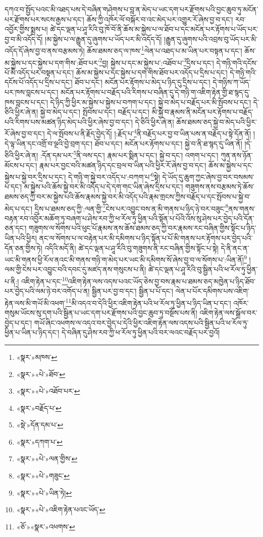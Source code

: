 དཀའ་བ་སྤྱོད་པའང་མི་འཐད་པས་དེ་བཞིན་གཤེགས་པ་བླ་ན་མེད་པ་ཡང་དག་པར་རྫོགས་པའི་བྱང་ཆུབ་ཏུ་མངོན་པར་རྫོགས་པར་སངས་རྒྱས་པ་དང་། ཆོས་ཀྱི་འཁོར་ལོ་བསྐོར་བ་འང་མེད་པར་འགྱུར་རོ་ཞེས་བྱ་བ་དང་། རབ་འབྱོར་གྱིས་སྨྲས་པ། ཚེ་དང་ལྡན་པ་ཤཱ་རིའི་བུ་ཁོ་བོ་ནི་ཆོས་མ་སྐྱེས་པ་ལ་ཐོབ་པ་དང་མངོན་པར་རྟོགས་པ་ཡོད་པར་བྱ་བ་མི་འདོད་དོ། །མ་སྐྱེས་པ་ལ་རྒྱུན་དུ་ཞུགས་པ་ཡོད་པར་མི་འདོད་དོ། །རྒྱུན་དུ་ཞུགས་པའི་འབྲས་བུ་ཡོད་པར་མི་འདོད་དོ་ཞེས་བྱ་བ་ནས་བརྩམས་ཏེ། ཆོས་ཐམས་ཅད་ལ་ཁས་\footnote{«སྣར་»མཁས་}ལེན་པ་འཐད་པ་མ་ཡིན་པར་བསྟན་པ་དང་། ཆོས་མ་སྐྱེས་པ་དང་སྐྱེས་པ་དག་གིས་:ཐོབ་པར་\footnote{«སྣར་»«པེ་»ཐོབ་}བྱ། སྐྱེས་པ་དང་མ་སྐྱེས་པ་:འཐོབ་པ་\footnote{«སྣར་»«པེ་»འཐོབ་པར་}དྲིས་པ་དང་། དེ་གཉི་གའི་དངོས་པོ་མི་འདོད་པར་བསྟན་པ་དང་། ཆོས་མ་སྐྱེས་པ་དང་སྐྱེས་པ་དག་གིས་ཐོབ་པར་འདོད་པ་དྲིས་པ་དང་། དེ་གཉི་གའི་དངོས་པོ་འདོད་པ་དྲིས་པ་དང་། ཐོབ་པ་དང་། མངོན་པར་རྟོགས་པ་མེད་པ་ཉིད་དུ་དྲིས་པ་དང་། དེ་གཉིས་ཀ་ཡོད་པར་ཁས་བླངས་པ་དང་། མངོན་པར་རྟོགས་པ་བརྗོད་པའི་རིགས་པ་བཞིན་དུ་དེ་གཉི་ག་འཇིག་རྟེན་གྱི་ཐ་སྙད་དུ་ཁས་བླངས་པ་དང་། དེ་ཉིད་ཀྱི་ཕྱིར་མ་སྐྱེས་པ་སྐྱེས་པ་བཀག་པ་དང་། སྐྱེ་བ་མེད་པ་བརྗོད་པར་མི་སྤོབས་པ་དང་། དེ་ཅིའི་ཕྱིར་ཞེ་ན། སྐྱེ་བ་མེད་པ་དང་། སྤོབས་པ་དང་། བརྗོད་པ་དང་། མི་སྐྱེ་བ་རྣམས་ནི་མངོན་པར་རྟོགས་པ་བརྗོད་པའི་རིགས་པས་མཚན་ཉིད་མེད་པའི་ཕྱིར་ཞེས་བྱ་བ་དང་། དེ་ཅིའི་ཕྱིར་ཞེ་ན། ཆོས་ཐམས་ཅད་སྐྱེ་བ་མེད་པའི་ཕྱིར་རོ་ཞེས་བྱ་བ་དང་། དེ་ལ་སྤོབས་པ་ནི་རྗོད་བྱེད་དོ། །:རྗོད་པ་\footnote{«སྣར་»བརྗོད་པ་}ནི་བརྗོད་པར་བྱ་བ་ཡིན་པས་ན་བརྗོད་པ་སྟེ་དོན་ནོ། །དེ་ལྟ་ཡིན་དང་འགྲོ་བ་ལྔའི་བྱེ་བྲག་དང་། ཐོབ་པ་དང་། མངོན་པར་རྟོགས་པ་དང་། སྐྱེ་བ་ནི་ཐ་སྙད་དུ་ཡིན་ནོ། །དེ་ཅིའི་ཕྱིར་ཞེ་ན། :དོན་དམ་པར་\footnote{«སྡེ་»དོན་དམ་པ་}ནི་ལས་དང་། རྣམ་པར་སྨིན་པ་དང་། སྐྱེ་བ་དང་། འགག་པ་དང་། ཀུན་ནས་ཉོན་མོངས་པ་དང་། རྣམ་པར་བྱང་བའི་མཚན་ཉིད་དང་བྲལ་བ་ཡིན་པའི་ཕྱིར་རོ་ཞེས་བྱ་བ་དང་། ཆོས་མ་སྐྱེས་པ་དང་སྐྱེས་པ་སྐྱེ་བར་དྲིས་པ་དང་། དེ་གཉི་ག་སྐྱེ་བར་འདོད་པ་:བཀག་པ་\footnote{«སྣར་»དཀག་པ་}སྟེ། དེ་ཡོད་དུ་ཆུག་ཀྱང་ཞེས་བྱ་བར་བསམས་པ་དང་། མ་སྐྱེས་པའི་ཆོས་སྐྱེ་བར་མི་འདོད་པ་དེ་དག་གང་ཡིན་ཞེས་དྲིས་པ་དང་། གཟུགས་ནས་བརྩམས་ཏེ་ཆོས་ཐམས་ཅད་ཀྱི་བར་མ་སྐྱེས་པའི་ཆོས་རྣམས་སྐྱེ་བར་མི་འདོད་པའི་རྣམ་གྲངས་ཀྱིས་བརྗོད་པ་དང་སྤོབས་པ་སྐྱེ་བ་མེད་པ་དང་། དྲིས་པ་ཐམས་ཅད་ཀྱི་:ལན་གྱི་\footnote{«སྣར་»«པེ་»ལན་གྱིས་}ངེས་པར་འབྱུང་བས་ན་མི་གནས་པ་ཉིད་ཉེ་བར་བཟུང་\footnote{«སྣར་»«པེ་»གཟུང་}ནས་གནས་བརྟན་རབ་འབྱོར་མཆོག་ཏུ་བཞག་པ་ཤེས་རབ་ཀྱི་ཕ་རོལ་ཏུ་ཕྱིན་པའི་སྟོན་པ་པོའི་འོས་སུ་ཤེས་པར་བྱེད་པའི་དོན་ཅན་དང་། གཟུགས་ལ་སོགས་པའི་ཕུང་པོ་རྣམས་ནས་ཆོས་ཐམས་ཅད་ཀྱི་བར་རྣམས་རང་བཞིན་གྱིས་སྟོང་པ་ཉིད་ཡིན་པའི་ཕྱིར། ནང་ལ་སོགས་པ་ལ་བརྟེན་པར་མི་དམིགས་པ་ཉིད་སྟོན་པ་པོ་མི་གནས་པར་རྟོགས་པར་བྱེད་པའི་དོན་ཅན་གྱིས་ཏེ། འདིའི་མདོ་ནི། ཚེ་དང་ལྡན་པ་ཤཱ་རིའི་བུ་གཟུགས་ནི་རང་བཞིན་གྱིས་སྟོང་པ་སྟེ། དེ་ནི་ནང་ན་ཡང་མི་གནས་ཕྱི་རོལ་ནའང་མི་གནས་གཉི་ག་མེད་པར་ཡང་མི་དམིགས་སོ་ཞེས་བྱ་བ་ལ་སོགས་པ་:ཡིན་ནོ།\footnote{«སྣར་»«པེ་»ཡིན་ཏེ།} །ལམ་གྱི་ངེས་པར་འབྱུང་བའི་དབང་དུ་མཛད་ནས་གསུངས་པ་ནི། ཚེ་དང་ལྡན་པ་ཤཱ་རིའི་བུ་སྦྱིན་པའི་ཕ་རོལ་ཏུ་ཕྱིན་པ་ནི:། འཇིག་རྟེན་པ་དང་\footnote{«སྣར་»«པེ་»འཇིག་རྟེན་པའང་ཡོད་}འཇིག་རྟེན་ལས་འདས་པའང་ཡོད་ཅེས་བྱ་བས་རྣམ་པ་ཐམས་ཅད་མཁྱེན་པ་ཉིད་ཐོབ་པར་བྱེད་པའི་ལམ་ཉེ་བར་འགོད་པ་ན། སྦྱིན་པར་བྱ་བ་དང་། སྦྱིན་པ་པོ་དང་། ལེན་པ་པོར་དམིགས་པས་འཇིག་རྟེན་ལས་མི་གཡོ་མི་འཕག་\footnote{«ཅོ་»«སྣར་»འཕགས་}མི་འདའ་བ་དེའི་ཕྱིར་འཇིག་རྟེན་པའི་ཕ་རོལ་ཏུ་ཕྱིན་པ་ཉིད་ཡིན་པ་དང་། འཁོར་གསུམ་ཡོངས་སུ་དག་པའི་སྦྱིན་པ་ཡང་དག་པར་རྫོགས་པའི་བྱང་ཆུབ་ཏུ་བསྔོས་པས་ནི། འཇིག་རྟེན་ལས་སྒྲོལ་བར་བྱེད་པ་དང་། གཡོ་ཞིང་འཕགས་ལ་འདའ་བར་བྱེད་པ་དེའི་ཕྱིར་འཇིག་རྟེན་ལས་འདས་པའི་སྦྱིན་པའི་ཕ་རོལ་ཏུ་ཕྱིན་པ་ཡིན་པ་ཉིད་དང་། དེ་བཞིན་དུ་ཤེས་རབ་ཀྱི་ཕ་རོལ་ཏུ་ཕྱིན་པའི་བར་ལའང་བརྗོད་པར་བྱའོ། 